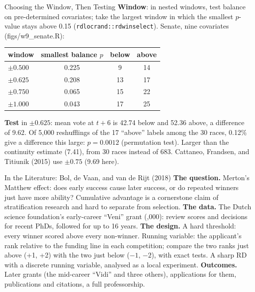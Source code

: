 \documentclass[aspectratio=169,11pt,xcolor=dvipsnames]{beamer}
\newcommand{\srcp}[1]{{\scriptsize\color{gray}(#1)}}
\newcommand{\srct}[1]{#1}
\begin{document}
\begin{frame}{Choosing the Window, Then Testing}
\textbf{Window}: in nested windows, test balance on pre-determined covariates;
take the largest window in which the smallest $p$-value stays above 0.15
(\texttt{rdlocrand::rdwinselect}). Senate, nine covariates \srcp{figs/w9\_senate.R}:
\vskip2pt
\begin{center}\small
\renewcommand{\arraystretch}{1.08}
\begin{tabular}{@{}lccc@{}}
\toprule
window & smallest balance $p$ & below & above \\
\midrule
$\pm 0.500$ & 0.225 & 9 & 14 \\
$\pm 0.625$ & 0.208 & 13 & 17 \\
$\pm 0.750$ & 0.065 & 15 & 22 \\
$\pm 1.000$ & 0.043 & 17 & 25 \\
\bottomrule
\end{tabular}
\end{center}
\vskip2pt
\textbf{Test} in $\pm 0.625$: mean vote at $t+6$ is 42.74 below and 52.36 above,
a difference of \alert{9.62}. Of 5,000 reshufflings of the 17 ``above'' labels
among the 30 races, 0.12\% give a difference this large: $p = 0.0012$ (permutation test).
\vskip3pt
{\footnotesize Larger than the continuity estimate (7.41), from 30 races instead
of 683. \srct{Cattaneo, Frandsen, and Titiunik (2015)} use $\pm 0.75$ (9.69 here).}
\end{frame}

\begin{frame}{In the Literature: Bol, de Vaan, and van de Rijt (2018)}
\textbf{The question.} Merton's Matthew effect: does early success cause later
success, or do repeated winners just have more ability? Cumulative advantage
is a cornerstone claim of stratification research and hard to separate from
selection.
\vskip3pt
\textbf{The data.} The Dutch science foundation's early-career ``Veni'' grant
(,000): review scores and decisions for recent PhDs, followed for
up to 16 years.
\vskip3pt
\textbf{The design.} A hard threshold: every winner scored above every
non-winner. Running variable: the applicant's \alert{rank} relative to the
funding line in each competition; compare the two ranks just above (+1, +2)
with the two just below ($-1$, $-2$), with exact tests. A sharp RD with a
discrete running variable, analysed as a local experiment.
\vskip3pt
\textbf{Outcomes.} Later grants (the mid-career ``Vidi'' and three others),
applications for them, publications and citations, a full professorship.
\end{frame}
\end{document}
